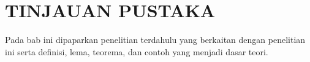 \chapter{TINJAUAN PUSTAKA}
Pada bab ini dipaparkan penelitian terdahulu yang berkaitan dengan penelitian ini serta definisi, lema, teorema, dan contoh yang menjadi dasar teori.



